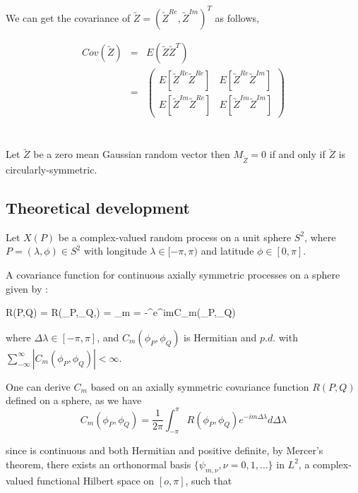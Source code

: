 We can get the covariance of $\utilde{Z}=(\utilde{Z}^{Re}, \utilde{Z}^{Im})^T$ as follows,

\begin{eqnarray*}
	Cov(\utilde{Z}) &=& E(\utilde{Z}\utilde{Z}^T) \\
	&=& \left( \begin{array}{ll}
	E[\utilde{Z}^{Re}\utilde{Z}^{Re}] &  E[\utilde{Z}^{Re}\utilde{Z}^{Im}] \\
	E[\utilde{Z}^{Im}\utilde{Z}^{Re}] &  E[\utilde{Z}^{Im}\utilde{Z}^{Im}]
	\end{array}
	\right) \\
\end{eqnarray*}

\begin{thm}[Gallager, 2008] \label{circular_theory} \hfill \\
	Let $\utilde{Z}$ be a zero mean Gaussian random vector then $M_{\utilde{Z}}=0$ if and only if $\utilde{Z}$ is circularly-symmetric.
\end{thm}


\subsection{Theoretical development}

Let $X(P)$ be a complex-valued random process on a unit sphere $S^2$, where $P = (\lambda, \phi) \in S^2$ with longitude $\lambda \in [-\pi, \pi)$ and latitude $\phi \in [0, \pi]$.
	
	A covariance function for continuous axially symmetric processes on a sphere given by \cite[proposition 1]{Huang2012}:
	
	\beq \label{R(PQ)-01}
	R(P,Q) = R(\phi_P,\phi_Q,\Delta\lambda) = \sum_{m = -\infty}^{\infty}e^{im\Delta\lambda}C_m(\phi_P,\phi_Q)
	\eeq
	
	where $\Delta\lambda \in [-\pi,\pi]$, and $C_m(\phi_P,\phi_Q)$ is Hermitian and $p.d.$ with $\sum_{-\infty}^{\infty}|C_m(\phi_P,\phi_Q)|<\infty$.
	
	One can derive $C_m$ based on an axially symmetric covariance function $R(P,Q)$ defined on a sphere, as we have
	\[ C_m(\phi_P, \phi_Q) = \frac{1}{2\pi}\int_{-\pi}^{\pi} R(\phi_P, \phi_Q)e^{-im\Delta\lambda} d\Delta\lambda \]
	
	since \Cm is continuous and both Hermitian and positive definite, by Mercer's theorem, there exists an orthonormal basis $\{\psi_{m,\nu}, \nu = 0,1,\ldots \}$ in $L^2$, a complex-valued functional Hilbert space on $[o,\pi ]$, such that
	
